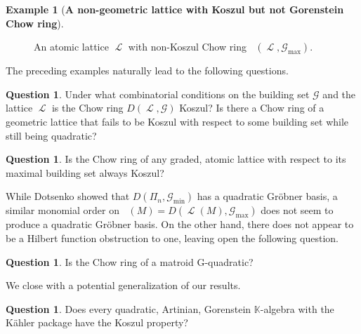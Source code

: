 \documentclass[11pt, reqno]{amsart}
\DeclareMathOperator{\Chow}{\underline{CH}}		%
\renewcommand{\hat}[1]{\widehat{#1}}
\newcommand{\kk}{\mathbb{K}}					%
\DeclareMathOperator{\LL}{\mathcal{L}}
\theoremstyle{definition}
\newtheorem{example}[thm]{Example}
\newtheorem{question}[thm]{Question}
\numberwithin{equation}{section}
\numberwithin{table}{section}
\begin{document}
\begin{spacing}{1.1}
\begin{example}[\textbf{A non-geometric lattice with Koszul but not Gorenstein Chow ring}]
\begin{figure}[ht] 
\begin{center}
\caption{An atomic lattice $\LL$ with non-Koszul Chow ring $\Chow(\LL,\mathcal{G}_{\max})$.}\label{lat1}
\end{center}
\end{figure}

\end{example}

The preceding examples naturally lead to the following questions.

\begin{question}
Under what combinatorial conditions on the building set $\mathcal{G}$ and the lattice $\LL$ is the Chow ring $D(\LL, \mathcal{G})$ Koszul?  Is there a  Chow ring of a geometric lattice that fails to be Koszul with respect to some building set while still being quadratic?
\end{question}

\begin{question}
Is the Chow ring of any graded, atomic lattice with respect to its maximal building set always Koszul?
\end{question}



While Dotsenko showed that $D(\Pi_n,\mathcal{G}_{\mathrm{min}})$ has a quadratic Gr\"obner basis, a similar monomial order on $\Chow(M) = D(\LL(M),\mathcal{G}_{\mathrm{max}})$ does not seem to produce a quadratic Gr\"obner basis.  On the other hand, there does not appear to be a Hilbert function obstruction to one, leaving open the following question.

\begin{question}
Is the Chow ring of a matroid G-quadratic?
\end{question}

We close with a potential generalization of our results.

\begin{question}
Does every quadratic, Artinian, Gorenstein $\kk$-algebra with the K\"ahler package have the Koszul property?
\end{question}


\end{spacing}
\end{document}
